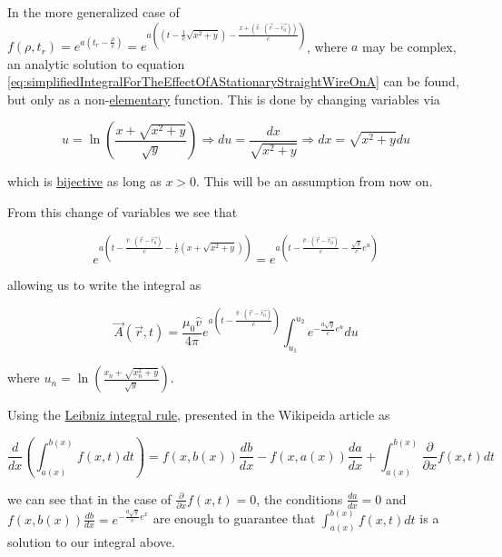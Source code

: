﻿\documentclass{article}
\begin{document}
In the more generalized case of $f(\rho, t_r) = e^{a(t_r - \frac{\rho}{c})} = e^{a((t - \frac{1}{c} \sqrt{x^2 + y}) - \frac{x + (\hat{v} \cdot (\vec{r} - \vec{r_0}))}{c})}$, where $a$ may be complex, an analytic solution to equation \ref{eq:simplifiedIntegralForTheEffectOfAStationaryStraightWireOnA} can be found, but only as a non-\href{https://en.wikipedia.org/wiki/Elementary_function}{elementary} function. This is done by changing variables via

\begin{equation*}
    u = \ln \left( \frac{x + \sqrt{x^2 + y}}{\sqrt{y}} \right) \Rightarrow du = \frac{dx}{\sqrt{x^2 + y}} \Rightarrow dx = \sqrt{x^2 + y} du
\end{equation*}

which is \href{https://en.wikipedia.org/wiki/Bijection}{bijective} as long as $x > 0$. This will be an assumption from now on.

From this change of variables we see that

\begin{equation*}
    e^{a(t - \frac{\hat{v} \cdot (\vec{r} - \vec{r_0})}{c} - \frac{1}{c} (x + \sqrt{x^2 + y}))} = e^{a(t - \frac{\hat{v} \cdot (\vec{r} - \vec{r_0})}{c} - \frac{\sqrt{y}}{c} e^u)}
\end{equation*}

allowing us to write the integral as

\begin{equation*}
   \vec{A}(\vec{r}, t) = \frac{\mu_0 \hat{v}}{4 \pi} e^{a(t - \frac{\hat{v} \cdot (\vec{r} - \vec{r_0})}{c})} \int_{u_1}^{u_2} e^{- \frac{a \sqrt{y}}{c} e^u} du
\end{equation*}

where $u_n = \ln \left( \frac{x_n + \sqrt{x_n^2 + y}}{\sqrt{y}} \right)$.

Using the \href{https://en.wikipedia.org/wiki/Leibniz_integral_rule}{Leibniz integral rule}, presented in the Wikipeida article as

\begin{equation*}
    \frac{d}{dx} \left( \int_{a(x)}^{b(x)} f(x, t) dt \right) = f(x, b(x)) \frac{db}{dx} - f(x, a(x)) \frac{da}{dx} + \int_{a(x)}^{b(x)} \frac{\partial}{\partial x} f(x, t) dt
\end{equation*}

we can see that in the case of $\frac{\partial}{\partial x} f(x, t) = 0$, the conditions $\frac{da}{dx} = 0$ and $f(x, b(x)) \frac{db}{dx} = e^{- \frac{a \sqrt{y}}{c} e^x}$ are enough to guarantee that $\int_{a(x)}^{b(x)} f(x, t) dt$ is a solution to our integral above.
\end{document}
